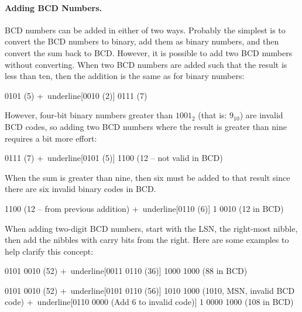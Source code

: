 \paragraph{Adding BCD Numbers.} \ac{BCD} numbers can be added in either of two ways. Probably the simplest is to convert the \ac{BCD} numbers to binary, add them as binary numbers, and then convert the sum back to \ac{BCD}. However, it is possible to add two \ac{BCD} numbers without converting. When two \ac{BCD} numbers are added such that the result is less than ten, then the addition is the same as for binary numbers:

\begin{binDisp}[commandchars=~\[\]]
     0101  (5)
    +~underline[0010  (2)]
     0111  (7)
\end{binDisp}

However, four-bit binary numbers greater than $ 1001_2 $ (that is: $ 9_{10} $) are invalid \ac{BCD} codes, so adding two \ac{BCD} numbers where the result is greater than nine requires a bit more effort:

\begin{binDisp}[commandchars=~\[\]]
     0111  (7)
    +~underline[0101  (5)]
     1100  (12 -- not valid in BCD)
\end{binDisp}

When the sum is greater than nine, then six must be added to that result since there are six invalid binary codes in \ac{BCD}.

\begin{binDisp}[commandchars=~\[\]]
     1100  (12 -- from previous addition)
    +~underline[0110  (6)]
   1 0010  (12 in BCD)
\end{binDisp}

When adding two-digit \ac{BCD} numbers, start with the \ac{LSN}, the right-most nibble, then add the nibbles with carry bits from the right. Here are some examples to help clarify this concept:

\begin{binDisp}[commandchars=~\[\], samepage=true]
     0101 0010  (52)
    +~underline[0011 0110  (36)]
     1000 1000  (88 in BCD)
\end{binDisp}

\begin{binDisp}[commandchars=~\[\], samepage=true]
     0101 0010  (52)
    +~underline[0101 0110  (56)]
     1010 1000  (1010, MSN, invalid BCD code)
    +~underline[0110 0000  (Add 6 to invalid code)]
   1 0000 1000  (108 in BCD)
\end{binDisp}

